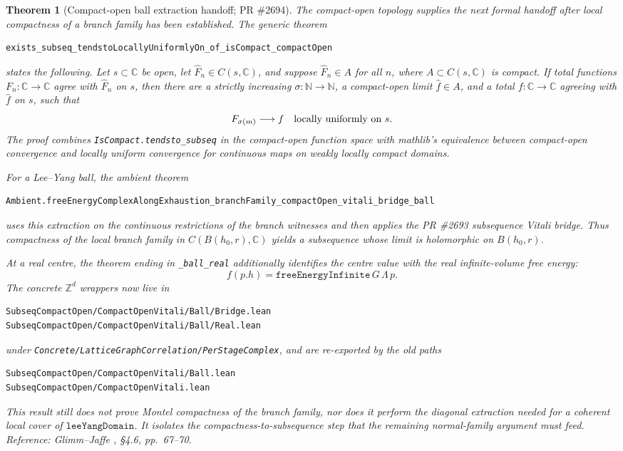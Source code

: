 \documentclass[a4paper,11pt]{article}
\newtheorem{theorem}{Theorem}
\begin{document}
\begin{theorem}[Compact-open ball extraction handoff; PR \#2694]
The compact-open topology supplies the next formal handoff after local
compactness of a branch family has been established.  The generic theorem
\begin{Verbatim}
exists_subseq_tendstoLocallyUniformlyOn_of_isCompact_compactOpen
\end{Verbatim}
states the following.  Let \(s\subset\mathbb C\) be open, let
\(\widehat F_n\in C(s,\mathbb C)\), and suppose \(\widehat F_n\in A\) for all
\(n\), where \(A\subset C(s,\mathbb C)\) is compact.  If total functions
\(F_n:\mathbb C\to\mathbb C\) agree with \(\widehat F_n\) on \(s\), then there
are a strictly increasing \(\sigma:\mathbb N\to\mathbb N\), a compact-open
limit \(\widehat f\in A\), and a total \(f:\mathbb C\to\mathbb C\) agreeing
with \(\widehat f\) on \(s\), such that
\[
  F_{\sigma(m)}\longrightarrow f
  \quad\hbox{locally uniformly on }s .
\]
The proof combines \texttt{IsCompact.tendsto\_subseq} in the compact-open
function space with mathlib's equivalence between compact-open convergence and
locally uniform convergence for continuous maps on weakly locally compact
domains.

For a Lee--Yang ball, the ambient theorem
\begin{Verbatim}
Ambient.freeEnergyComplexAlongExhaustion_branchFamily_compactOpen_vitali_bridge_ball
\end{Verbatim}
uses this extraction on the continuous restrictions of the branch witnesses and
then applies the PR \#2693 subsequence Vitali bridge.  Thus compactness of the
local branch family in \(C(B(h_0,r),\mathbb C)\) yields a subsequence whose
limit is holomorphic on \(B(h_0,r)\).

At a real centre, the theorem ending in \texttt{\_ball\_real} additionally
identifies the centre value with the real infinite-volume free energy:
\[
  f(p.h)=\texttt{freeEnergyInfinite}\,G\,\Lambda\,p .
\]
The concrete \(\mathbb Z^d\) wrappers now live in
\begin{Verbatim}[fontsize=\footnotesize]
SubseqCompactOpen/CompactOpenVitali/Ball/Bridge.lean
SubseqCompactOpen/CompactOpenVitali/Ball/Real.lean
\end{Verbatim}
under \texttt{Concrete/LatticeGraphCorrelation/PerStageComplex}, and are
re-exported by the old paths
\begin{Verbatim}[fontsize=\footnotesize]
SubseqCompactOpen/CompactOpenVitali/Ball.lean
SubseqCompactOpen/CompactOpenVitali.lean
\end{Verbatim}

This result still does not prove Montel compactness of the branch family, nor
does it perform the diagonal extraction needed for a coherent local cover of
\(\texttt{leeYangDomain}\).  It isolates the compactness-to-subsequence step
that the remaining normal-family argument must feed.
Reference: Glimm--Jaffe \cite{glimm-jaffe}, \S 4.6, pp.~67--70.
\end{theorem}
\end{document}
